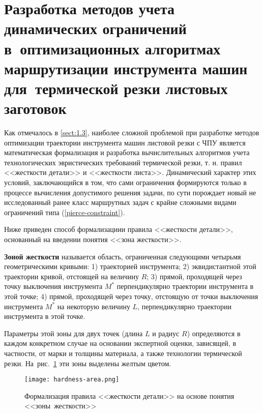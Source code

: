 
\section{
  Разработка методов учета динамических ограничений
  в~оптимизационных алгоритмах
  маршрутизации инструмента машин
  для~термической резки листовых заготовок
}
\label{sect:2.3}
\setcounter{equation}{0}

Как отмечалось в \ref{sect:1.3},
наиболее сложной проблемой при разработке методов оптимизации
траектории инструмента машин листовой резки с ЧПУ
является математическая формализация и
разработка вычислительных алгоритмов учета
технологических эвристических требований термической резки,
т. н. правил <<жесткости детали>>
и <<жесткости листа>>.
Динамический характер этих условий, заключающийся в том,
что сами ограничения формируются только в процессе вычисления
допустимого решения задачи, по сути порождает
новый не исследованный ранее класс маршрутных задач
с крайне сложными видами ограничений типа
(\ref{pierce-constraint}).

Ниже приведен способ формализациии правила <<жесткости детали>>,
основанный на введении понятия <<зона жесткости>>.

\begin{opred}
  {\bf Зоной жесткости}
  называется область,
  ограниченная следующими четырьмя геометрическими кривыми:
  1) траекторией инструмента;
  2) эквидистантной этой траектории кривой, отстоящей на величину $R$;
  3) прямой, проходящей через точку выключения инструмента $M^*$
  перпендикулярно траектории инструмента в этой точке;
  4) прямой, проходящей через точку,
  отстоящую от точки выключения инструмента $M^*$ на некоторую величину $L$,
  перпендикулярно траектории инструмента в этой точке.
\end{opred}

Параметры этой зоны для двух точек
(длина $L$ и радиус $R$)
определяются в каждом конкретном случае
на основании экспертной оценки,
зависящей, в частности, от марки и толщины материала,
а также технологии термической резки.
На~рис.~\ref{hardness-area}
эти зоны выделены желтым цветом.

\begin{figure}[H]
  \centering
  \texttt{[image: hardness-area.png]}
  \caption{
    Формализация правила <<жесткости детали>>
    на основе понятия
    <<зоны~жесткости>>
  }
  \label{hardness-area}
\end{figure}

